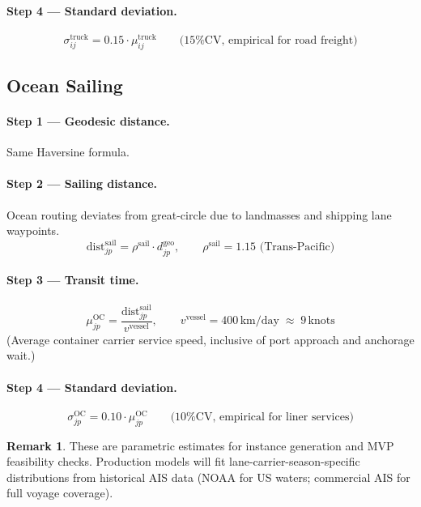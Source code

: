 \documentclass[11pt,a4paper]{article}
\theoremstyle{definition}
\newtheorem{remark}{Remark}
\begin{document}
\paragraph{Step 4 --- Standard deviation.}
\[
  \sigma_{ij}^{\text{truck}} = 0.15 \cdot \mu_{ij}^{\text{truck}} \qquad \text{(15\% CV, empirical for road freight)}
\]

\subsection{Ocean Sailing}

\paragraph{Step 1 --- Geodesic distance.} Same Haversine formula.

\paragraph{Step 2 --- Sailing distance.} Ocean routing deviates from great-circle due
to landmasses and shipping lane waypoints.
\[
  \text{dist}_{jp}^{\text{sail}} = \rho^{\text{sail}} \cdot d_{jp}^{\text{geo}},
  \qquad \rho^{\text{sail}} = 1.15 \text{ (Trans-Pacific)}
\]

\paragraph{Step 3 --- Transit time.}
\[
  \mu_{jp}^{\text{OC}} = \frac{\text{dist}_{jp}^{\text{sail}}}{v^{\text{vessel}}},
  \qquad v^{\text{vessel}} = 400\,\text{km/day} \;\approx\; 9\,\text{knots}
\]
(Average container carrier service speed, inclusive of port approach and anchorage wait.)

\paragraph{Step 4 --- Standard deviation.}
\[
  \sigma_{jp}^{\text{OC}} = 0.10 \cdot \mu_{jp}^{\text{OC}} \qquad \text{(10\% CV, empirical for liner services)}
\]

\begin{remark}
These are parametric estimates for instance generation and MVP feasibility checks.
Production models will fit lane-carrier-season-specific distributions from historical
AIS data (NOAA for US waters; commercial AIS for full voyage coverage).
\end{remark}

\end{document}
